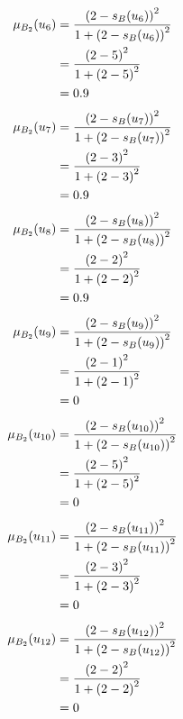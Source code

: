 \documentclass[a4paper]{book}
\begin{document}
				\begin{align}
					\mu_{B_2}(u_6) &= \frac{\left(2-s_B(u_6)\right)^2}{1 + \left(2-s_B(u_6)\right)^2}\\
					&= \frac{\left(2-5\right)^2}{1 + \left(2-5\right)^2} \notag \\
					&= 0.9 \notag
				\end{align}
				\begin{align}
					\mu_{B_2}(u_7) &= \frac{\left(2-s_B(u_7)\right)^2}{1 + \left(2-s_B(u_7)\right)^2}\\
					&= \frac{\left(2-3\right)^2}{1 + \left(2-3\right)^2} \notag \\
					&= 0.9 \notag
				\end{align}
				\begin{align}
					\mu_{B_2}(u_8) &= \frac{\left(2-s_B(u_8)\right)^2}{1 + \left(2-s_B(u_8)\right)^2}\\
					&= \frac{\left(2-2\right)^2}{1 + \left(2-2\right)^2} \notag \\
					&= 0.9 \notag
				\end{align}
				\begin{align}
					\mu_{B_2}(u_9) &= \frac{\left(2-s_B(u_9)\right)^2}{1 + \left(2-s_B(u_9)\right)^2}\\
					&= \frac{\left(2-1\right)^2}{1 + \left(2-1\right)^2} \notag \\
					&= 0 \notag
				\end{align}
				\begin{align}
					\mu_{B_2}(u_{10}) &= \frac{\left(2-s_B(u_{10})\right)^2}{1 + \left(2-s_B(u_{10})\right)^2}\\
					&= \frac{\left(2-5\right)^2}{1 + \left(2-5\right)^2} \notag \\
					&= 0 \notag
				\end{align}
				\begin{align}
					\mu_{B_2}(u_{11}) &= \frac{\left(2-s_B(u_{11})\right)^2}{1 + \left(2-s_B(u_{11})\right)^2}\\
					&= \frac{\left(2-3\right)^2}{1 + \left(2-3\right)^2} \notag \\
					&= 0 \notag
				\end{align}
				\begin{align}
					\mu_{B_2}(u_{12}) &= \frac{\left(2-s_B(u_{12})\right)^2}{1 + \left(2-s_B(u_{12})\right)^2}\\
					&= \frac{\left(2-2\right)^2}{1 + \left(2-2\right)^2} \notag \\
					&= 0 \notag
				\end{align}
\end{document}
